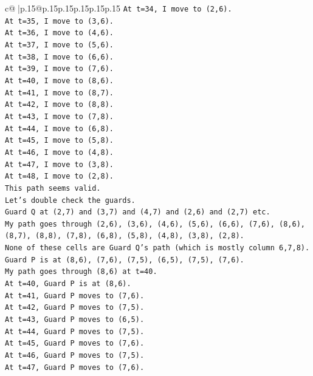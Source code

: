 \documentclass{article}
\begin{document}
{\begin{supertabular}{c@{$\;$}|p{.15\linewidth}@{}p{.15\linewidth}p{.15\linewidth}p{.15\linewidth}p{.15\linewidth}p{.15\linewidth}}
{{{\texttt{At t=34, I move to (2,6).} \\
\texttt{At t=35, I move to (3,6).} \\
\texttt{At t=36, I move to (4,6).} \\
\texttt{At t=37, I move to (5,6).} \\
\texttt{At t=38, I move to (6,6).} \\
\texttt{At t=39, I move to (7,6).} \\
\texttt{At t=40, I move to (8,6).} \\
\texttt{At t=41, I move to (8,7).} \\
\texttt{At t=42, I move to (8,8).} \\
\texttt{At t=43, I move to (7,8).} \\
\texttt{At t=44, I move to (6,8).} \\
\texttt{At t=45, I move to (5,8).} \\
\texttt{At t=46, I move to (4,8).} \\
\texttt{At t=47, I move to (3,8).} \\
\texttt{At t=48, I move to (2,8).} \\
\texttt{This path seems valid.} \\
\texttt{Let's double check the guards.} \\
\texttt{Guard Q at (2,7) and (3,7) and (4,7) and (2,6) and (2,7) etc.} \\
\texttt{My path goes through (2,6), (3,6), (4,6), (5,6), (6,6), (7,6), (8,6), (8,7), (8,8), (7,8), (6,8), (5,8), (4,8), (3,8), (2,8).} \\
\texttt{None of these cells are Guard Q's path (which is mostly column 6,7,8).} \\
\texttt{Guard P is at (8,6), (7,6), (7,5), (6,5), (7,5), (7,6).} \\
\texttt{My path goes through (8,6) at t=40.} \\
\texttt{At t=40, Guard P is at (8,6).} \\
\texttt{At t=41, Guard P moves to (7,6).} \\
\texttt{At t=42, Guard P moves to (7,5).} \\
\texttt{At t=43, Guard P moves to (6,5).} \\
\texttt{At t=44, Guard P moves to (7,5).} \\
\texttt{At t=45, Guard P moves to (7,6).} \\
\texttt{At t=46, Guard P moves to (7,5).} \\
\texttt{At t=47, Guard P moves to (7,6).} \\
}}}
\end{supertabular}}
\end{document}
